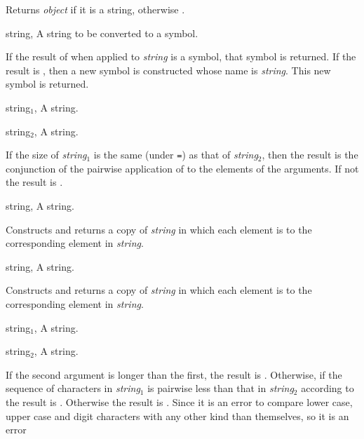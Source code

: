 \begin{optDefinition}
\begin{arguments}
\end{arguments}
%
\result
Returns {\em object\/} if it is a string, otherwise \nil.
%
\begin{specargs}
    \item[string, \classref{string}] A string to be converted to a symbol.
\end{specargs}
%
\result
If the result of  when applied to {\em string\/}
is a symbol, that symbol is returned.  If the result is \nil, then
a new symbol is constructed whose name is {\em string}.  This new
symbol is returned.
%
%
\begin{specargs}
    \item[string$_1$, \classref{string}] A string.
    \item[string$_2$, \classref{string}] A string.
\end{specargs}
%
\result
If the size of {\em string$_1$} is the same (under {\tt =}) as that of
{\em string$_2$}, then the result is the conjunction of the pairwise
application of  to the elements of the arguments.  If not
the result is \nil.
%
%
\begin{specargs}
    \item[string, \classref{string}] A string.
\end{specargs}
%
\result
Constructs and returns a copy of {\em string\/} in which each element
is  to the corresponding element in {\em string}.
%
%
\begin{specargs}
    \item[string, \classref{string}] A string.
\end{specargs}
%
\result
Constructs and returns a copy of {\em string\/} in which each element
is  to the corresponding element in {\em string}.
%
%
\begin{specargs}
    \item[string$_1$, \classref{string}] A string.
    \item[string$_2$, \classref{string}] A string.
\end{specargs}
%
\result%
If the second argument is longer than the first, the result is \nil.  Otherwise,
if the sequence of characters in {\em string$_1$} is pairwise less than that in
{\em string$_2$} according to  the result is \true.
Otherwise the result is \nil.  Since it is an error to compare lower case, upper
case and digit characters with any other kind than themselves, so it is an error

\end{optDefinition}
